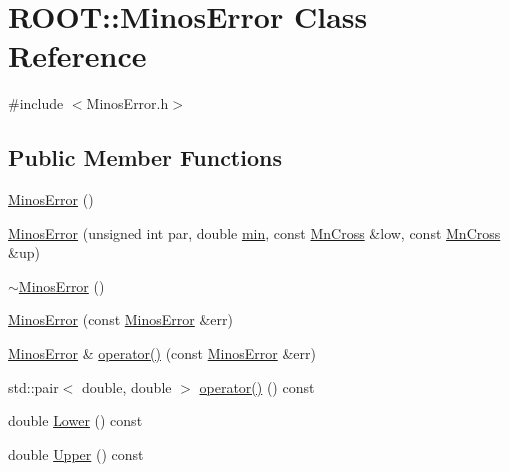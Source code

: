 \hypertarget{classROOT_1_1Minuit2_1_1MinosError}{}\section{R\+O\+OT\+:\+:Minos\+Error Class Reference}
\label{classROOT_1_1Minuit2_1_1MinosError}


{\ttfamily \#include $<$Minos\+Error.\+h$>$}

\subsection*{Public Member Functions}
\begin{DoxyCompactItemize}
\item 
\mbox{\hyperlink{classROOT_1_1Minuit2_1_1MinosError_a5cb0fad5d73d20905a57fb1c505c9fd2}{Minos\+Error}} ()
\item 
\mbox{\hyperlink{classROOT_1_1Minuit2_1_1MinosError_a400609986f7b4e3a93eab1a35e1f33ce}{Minos\+Error}} (unsigned int par, double \mbox{\hyperlink{SU3__internal_8h_ab0f5fed3171eb00d1c5f037d9f518a23}{min}}, const \mbox{\hyperlink{classROOT_1_1Minuit2_1_1MnCross}{Mn\+Cross}} \&low, const \mbox{\hyperlink{classROOT_1_1Minuit2_1_1MnCross}{Mn\+Cross}} \&up)
\item 
\mbox{\hyperlink{classROOT_1_1Minuit2_1_1MinosError_a8373afe22cd395ed995a061691c48dad}{$\sim$\+Minos\+Error}} ()
\item 
\mbox{\hyperlink{classROOT_1_1Minuit2_1_1MinosError_a95d558825494f594da873fef3518572e}{Minos\+Error}} (const \mbox{\hyperlink{classROOT_1_1Minuit2_1_1MinosError}{Minos\+Error}} \&err)
\item 
\mbox{\hyperlink{classROOT_1_1Minuit2_1_1MinosError}{Minos\+Error}} \& \mbox{\hyperlink{classROOT_1_1Minuit2_1_1MinosError_ac45b7f3397fe4c13e1811b486e10602a}{operator()}} (const \mbox{\hyperlink{classROOT_1_1Minuit2_1_1MinosError}{Minos\+Error}} \&err)
\item 
std\+::pair$<$ double, double $>$ \mbox{\hyperlink{classROOT_1_1Minuit2_1_1MinosError_ae5c75a96400736de9741f6c5b8314e31}{operator()}} () const
\item 
double \mbox{\hyperlink{classROOT_1_1Minuit2_1_1MinosError_ac412aab9b0a59a427fbe7e3cfad47f0c}{Lower}} () const
\item 
double \mbox{\hyperlink{classROOT_1_1Minuit2_1_1MinosError_a0223fde13608aadee1f15b51d15b2bf6}{Upper}} () const
\item 

\end{DoxyCompactItemize}
